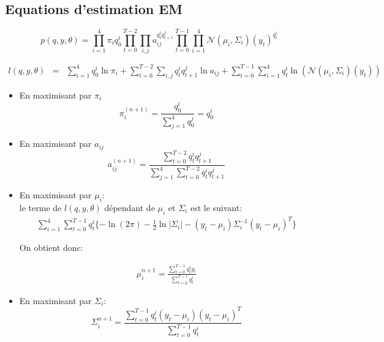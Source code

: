 \documentclass{article}
\begin{document}
\subsection{Equations d'estimation EM}

\begin{equation}
p(q, y, \theta) =  \prod_{i = 1}^4 \pi_i {q_0^i} \prod_{t = 0}^{T - 2} \prod_{i, j} a_{ij}^{q_t^i q_{t + 1}^j} \prod_{t = 0}^{T - 1} \prod_{i = 1}^{4} \mathcal{N}(\mu_i, \Sigma_i)(y_t)^{q_t^i}
\end{equation}

\begin{align}
l(q, y, \theta) & = & \sum_{i = 1}^4 q_0^i \ln \pi_i + \sum_{t = 0}^{T - 2} \sum_{i, j} q_t^i q_{t + 1}^j \ln a_{ij} + \sum_{t = 0}^{T - 1} \sum_{i = 1}^4 q_t^i \ln(\mathcal{N}(\mu_i, \Sigma_i)(y_t))
\end{align}

\begin{itemize}
\item En maximisant par $\pi_i$ \\
  \begin{equation}
  \pi_i^{(n + 1)} = \frac{q_0^i}{\sum_{j = 1}^4 q_0^j} = q_0^i
  \end{equation}

\item En maximisant par $a_{ij}$ \\
  \begin{equation}
  a_{ij}^{(n + 1)} = \frac{\sum_{t = 0}^{T - 2} q_t^i q_{t + 1}^j}{\sum_{j = 1}^4 \sum_{t = 0}^{T - 2}q_t^i q_{t + 1}^j}
  \end{equation}

\item En maximisant par $\mu_i$: \\
  le terme de $l(q, y, \theta)$ dépendant de $\mu_i$ et $\Sigma_i$ est le suivant:
  \begin{align}
  \sum_{i = 1}^{4} \sum_{t = 0}^{T - 1} q_t^i \{ - \ln(2 \pi) - \frac{1}{2} \ln |\Sigma_i| - (y_t - \mu_i) \Sigma_i^{-1} (y_t - \mu_i)^T\}
  \end{align}

  On obtient donc:

  \begin{align}
  \mu_i^{n + 1} = \frac{\sum_{t = 0}^{T - 1} q_t^i y_t}{\sum_{t = 0}^{T - 1}q_t^i}
  \end{align}

\item En maximisant par $\Sigma_i$: \\
  \begin{equation}
    \Sigma_i^{n + 1} = \frac{\sum_{t = 0}^{T - 1}q_t^i (y_t - \mu_i) (y_t - \mu_i)^T}{\sum_{t = 0}^{T - 1}q_t^i}
  \end{equation}
\end{itemize}
\end{document}
